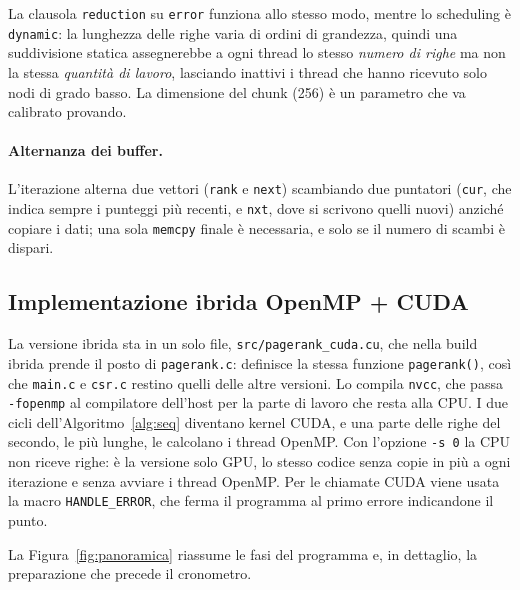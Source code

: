 \documentclass[11pt,a4paper]{article}
\newcommand{\stacco}{\par\medskip\noindent}
\begin{document}
\stacco
La clausola \texttt{reduction} su \texttt{error} funziona allo stesso modo,
mentre lo scheduling è \texttt{dynamic}: la lunghezza delle righe varia di
ordini di grandezza, quindi una suddivisione statica assegnerebbe a ogni
thread lo stesso \emph{numero di righe} ma non la stessa \emph{quantità di
lavoro}, lasciando inattivi i thread che hanno ricevuto solo nodi di grado
basso. La dimensione del chunk (256) è un parametro che va calibrato provando.

\paragraph{Alternanza dei buffer.}
L'iterazione alterna due vettori (\texttt{rank} e
\texttt{next}) scambiando due puntatori
(\texttt{cur}, che indica sempre i punteggi più recenti, e \texttt{nxt},
dove si scrivono quelli nuovi) anziché copiare i dati; una sola
\texttt{memcpy} finale è necessaria, e solo se il numero di scambi è
dispari.

\subsection{Implementazione ibrida OpenMP + CUDA}
\label{sec:cuda}

La versione ibrida sta in un solo file, \texttt{src/pagerank\_cuda.cu},
che nella build ibrida prende il posto di \texttt{pagerank.c}: definisce la
stessa funzione \texttt{pagerank()}, così che \texttt{main.c} e \texttt{csr.c}
restino quelli delle altre versioni. Lo compila \texttt{nvcc}, che passa
\texttt{-fopenmp} al compilatore dell'host per la parte di lavoro che resta
alla CPU. I due cicli dell'Algoritmo~\ref{alg:seq} diventano kernel CUDA, e una
parte delle righe del secondo, le più lunghe, le calcolano i thread OpenMP.
Con l'opzione \texttt{-s 0} la CPU non riceve righe: è la versione solo GPU,
lo stesso codice senza copie in più a ogni iterazione e senza avviare i thread
OpenMP. Per le chiamate CUDA
viene usata la macro \texttt{HANDLE\_ERROR}, che ferma il programma al primo
errore indicandone il punto.

\stacco
La Figura~\ref{fig:panoramica} riassume le fasi del programma e, in
dettaglio, la preparazione che precede il cronometro.
\end{document}
